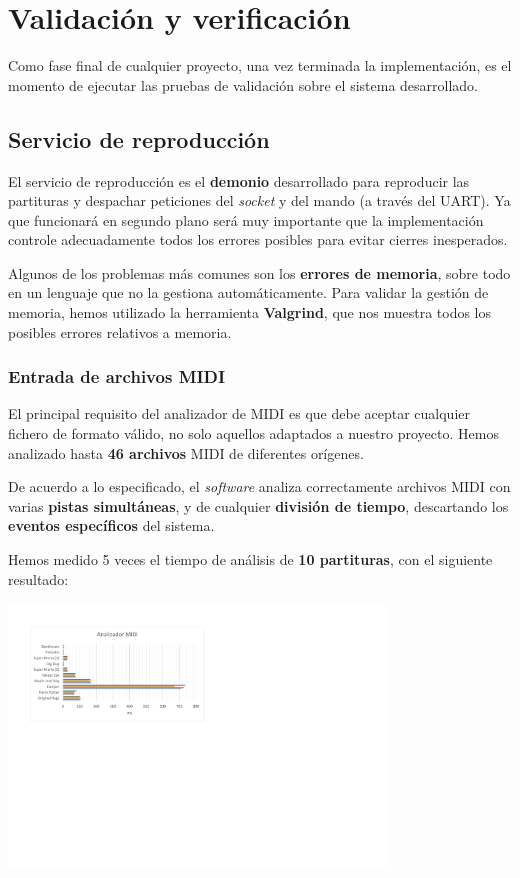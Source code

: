 \documentclass[10pt,a4paper]{article}
\begin{document}
	
	\section{Validación y verificación}
	
	Como fase final de cualquier proyecto, una vez terminada la implementación, es el momento de ejecutar las pruebas de validación sobre el sistema desarrollado.
	
	\subsection{Servicio de reproducción}
	
	El servicio de reproducción es el \textbf{demonio} desarrollado para reproducir las partituras y despachar peticiones del \textit{socket} y del mando (a través del UART). Ya que funcionará en segundo plano será muy importante que la implementación controle adecuadamente todos los errores posibles para evitar cierres inesperados.
	
	Algunos de los problemas más comunes son los \textbf{errores de memoria}, sobre todo en un lenguaje que no la gestiona automáticamente. Para validar la gestión de memoria, hemos utilizado la herramienta \textbf{Valgrind}, que nos muestra todos los posibles errores relativos a memoria.
	
	\subsubsection*{Entrada de archivos MIDI}
	
	El principal requisito del analizador de MIDI es que debe aceptar cualquier fichero de formato válido, no solo aquellos adaptados a nuestro proyecto. Hemos analizado hasta \textbf{46 archivos} MIDI de diferentes orígenes.
	
	De acuerdo a lo especificado, el \textit{software} analiza correctamente archivos MIDI con varias \textbf{pistas simultáneas}, y de cualquier \textbf{división de tiempo}, descartando los \textbf{eventos específicos} del sistema.
	
	Hemos medido 5 veces el tiempo de análisis de \textbf{10 partituras}, con el siguiente resultado:
	
	\begin{center}
		\includegraphics[width=0.75\textwidth]{images/lat_midi} 
	\end{center}
	
\end{document}
